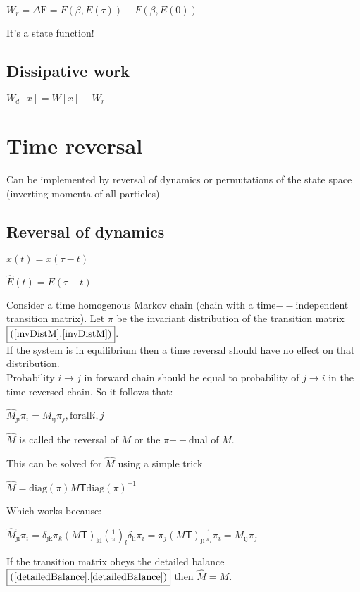 \documentclass{article}
\begin{document}
\(W_r=\text{$\Delta $F}=F(\beta ,E(\tau ))-F(\beta ,E(0))\)

It{'}s a state function!

\subsection*{Dissipative work}

\(W_d[x]=W[x]-W_r\)

\section*{Time reversal}

Can be implemented by reversal of dynamics or permutations of the state space (inverting momenta of all particles)

\subsection*{Reversal of dynamics}

\(\hat{x}(t)=x(\tau -t)\)

\(\hat{E}(t)=E(\tau -t)\)

Consider a time homogenous Markov chain (chain with a time$--$independent transition matrix). Let \(\pi\) be the invariant distribution of the transition
matrix \(\fbox{$(\ref{invDistM}.\ref{invDistM})$}\).\\
If the system is in equilibrium then a time reversal should have no effect on that distribution.\\
Probability \(i\to j\) in forward chain should be equal to probability of \(j\to i\) in the time reversed chain. So it follows that:

\(\hat{M}_{\text{ji}}\pi _i=M_{\text{ij}}\pi _j, \text{for} \text{all} i,j\)

\(\hat{M}\) is called the reversal of \(M\) or the \(\pi\)$--$dual of \(M\).

This can be solved for \(\hat{M}\) using a simple trick

\(\hat{M}=\text{diag}(\pi )M\mathsf{T}\text{diag}(\pi )^{-1}\)

Which works because:

\(\hat{M}_{\text{ji}}\pi _i=\delta _{\text{jk}}\pi _k(M\mathsf{T})_{\text{kl}}\left(\frac{1}{\pi }\right)_l\delta _{\text{li}}\pi _i=\pi _j(M\mathsf{T})_{\text{ji}}\frac{1}{\pi
_i}\pi _i=M_{\text{ij}}\pi _j\)

If the transition matrix obeys the detailed balance \(\fbox{$(\ref{detailedBalance}.\ref{detailedBalance})$}\) then \(\hat{M}=M\).
\end{document}
